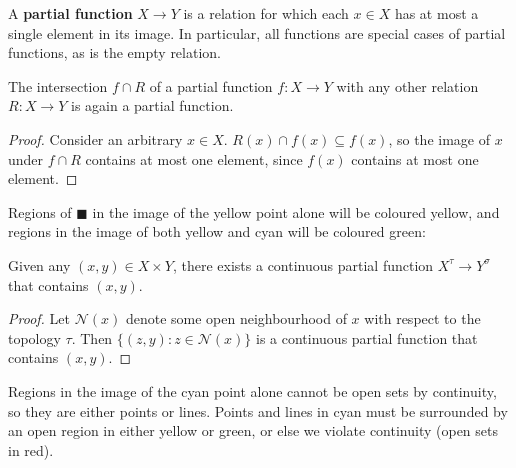 \begin{defn}
A \textbf{partial function} $X \rightarrow Y$ is a relation for which each $x \in X$ has at most a single element in its image. In particular, all functions are special cases of partial functions, as is the empty relation.
\end{defn}

\begin{lemma}\label{lem:capideal}
The intersection $f \cap R$ of a partial function $f: X \rightarrow Y$ with any other relation $R: X \rightarrow Y$ is again a partial function.
\begin{proof}
Consider an arbitrary $x \in X$. $R(x) \cap f(x) \subseteq f(x)$, so the image of $x$ under $f \cap R$ contains at most one element, since $f(x)$ contains at most one element.
\end{proof}
\end{lemma}

\begin{marginfigure}
\centering
{}
\caption{Regions of $\blacksquare$ in the image of the yellow point alone will be coloured yellow, and regions in the image of both yellow and cyan will be coloured green:}
\label{fig:yellowgreen}
\end{marginfigure}

\begin{lemma}\label{lem:edgecomplete}
Given any $(x,y) \in X \times Y$, there exists a continuous partial function $X^\tau \rightarrow Y^\sigma$ that contains $(x,y)$.
\begin{proof}
Let $\mathcal{N}(x)$ denote some open neighbourhood of $x$ with respect to the topology $\tau$. Then $\{ (z,y) : z \in \mathcal{N}(x) \}$ is a continuous partial function that contains $(x,y)$.
\end{proof}
\end{lemma}

\begin{marginfigure}
\centering
{}
\caption{Regions in the image of the cyan point alone cannot be open sets by continuity, so they are either points or lines. Points and lines in cyan must be surrounded by an open region in either yellow or green, or else we violate continuity (open sets in red).}
\label{fig:cyan}
\end{marginfigure}

